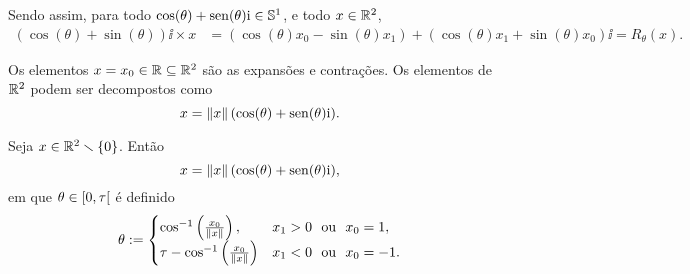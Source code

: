 Sendo assim, para todo $\cos(\theta) + \operatorname{sen}(\theta) \mathrm{i} \in \mathbb{S}^1$, e todo $x \in \mathbb{R}^2$,
	\begin{align*}
	(\cos(\theta) + \sin(\theta)) \ii \times x &= (\cos(\theta)x_0-\sin(\theta)x_1) +(\cos(\theta)x_1+\sin(\theta)x_0) \ii = R_\theta(x).
	\end{align*}

Os elementos $x = x_0 \in \mathbb{R} \subseteq \mathbb{R}^2$ são as expansões e contrações. Os elementos de $\mathbb{R}^2$ podem ser decompostos como
	\begin{equation*}
	x = \left\Vert{x}\right\Vert(\cos(\theta) + \operatorname{sen}(\theta) \mathrm{i}).
	\end{equation*}

\begin{proposition}
Seja $x \in \mathbb{R}^2 \smallsetminus \{0\}$. Então
	\begin{equation*}
	x = \left\Vert{x}\right\Vert(\cos(\theta) + \operatorname{sen}(\theta) \mathrm{i}),
	\end{equation*}
em que $\theta \in \left[{0},{\tau}\right[$ é definido
	\begin{equation*}
	\theta :=	\begin{cases}
				\cos^{-1}\left(\frac{x_0}{\left\Vert{x}\right\Vert}\right),			& x_1 > 0 \text{\ \ ou\ \ } x_0 = 1, \\
				\tau - \cos^{-1}\left(\frac{x_0}{\left\Vert{x}\right\Vert}\right)		& x_1 < 0 \text{\ \ ou\ \ } x_0 = -1.
				\end{cases}
	\end{equation*}
\end{proposition}
